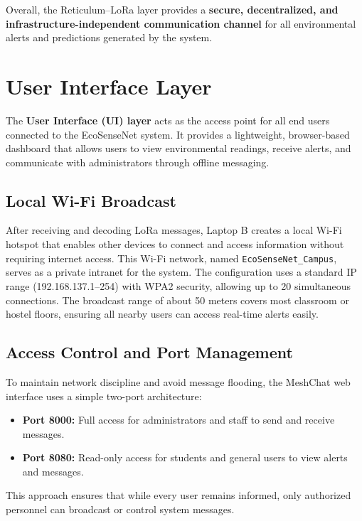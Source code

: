 Overall, the Reticulum–LoRa layer provides a \textbf{secure, decentralized, and infrastructure-independent communication channel} for all environmental alerts and predictions generated by the system.

\section{User Interface Layer}

The \textbf{User Interface (UI) layer} acts as the access point for all end users connected to the EcoSenseNet system. It provides a lightweight, browser-based dashboard that allows users to view environmental readings, receive alerts, and communicate with administrators through offline messaging.

\subsection{Local Wi-Fi Broadcast}

After receiving and decoding LoRa messages, Laptop B creates a local Wi-Fi hotspot that enables other devices to connect and access information without requiring internet access. This Wi-Fi network, named \texttt{EcoSenseNet\_Campus}, serves as a private intranet for the system. The configuration uses a standard IP range (192.168.137.1–254) with WPA2 security, allowing up to 20 simultaneous connections. The broadcast range of about 50 meters covers most classroom or hostel floors, ensuring all nearby users can access real-time alerts easily.

\subsection{Access Control and Port Management}

To maintain network discipline and avoid message flooding, the MeshChat web interface uses a simple two-port architecture:
\begin{itemize}
    \item \textbf{Port 8000:} Full access for administrators and staff to send and receive messages.
    \item \textbf{Port 8080:} Read-only access for students and general users to view alerts and messages.
\end{itemize}

This approach ensures that while every user remains informed, only authorized personnel can broadcast or control system messages.

